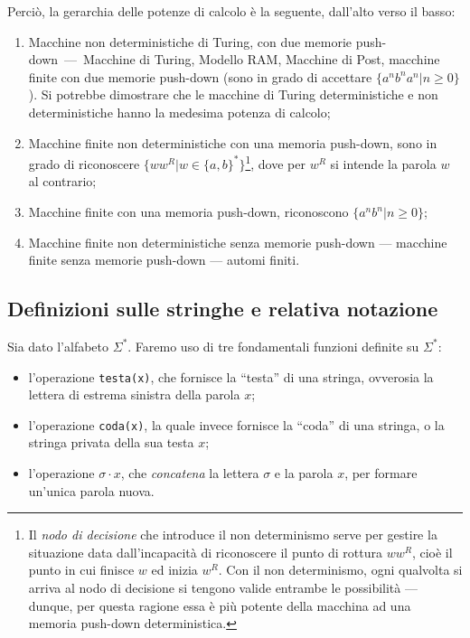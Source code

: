 \documentclass[10pt]{\classname}
\theoremstyle{definition}
\theoremstyle{definition}
\theoremstyle{definition}
\theoremstyle{definition}
\begin{document}
Perciò, la gerarchia delle potenze di calcolo è la seguente, dall'alto verso il basso:
\begin{enumerate}
    \item Macchine non deterministiche di Turing, con due memorie
        push-down~---~Macchine di Turing, Modello RAM, Macchine di Post,
        macchine finite con due memorie push-down (sono in grado di accettare
        $\{a^n b^n a^n| n \geq 0\}$). Si potrebbe dimostrare che le macchine di
        Turing deterministiche e non deterministiche hanno la medesima potenza
        di calcolo;
    \item Macchine finite non deterministiche con una memoria push-down, sono
        in grado di riconoscere $\{w w^R | w\in\{a,b\}^*\}$\footnote{Il
        \emph{nodo di decisione} che introduce il non determinismo serve per
    gestire la situazione data dall'incapacità di riconoscere il punto di
rottura $ww^R$, cioè il punto in cui finisce $w$ ed inizia $w^R$. Con il non
determinismo, ogni qualvolta si arriva al nodo di decisione si tengono valide
entrambe le possibilità --- dunque, per questa ragione essa è più potente della
macchina ad una memoria push-down deterministica.}, dove per $w^R$ si intende
la parola $w$ al contrario;
    \item Macchine finite con una memoria push-down, riconoscono $\{a^n
        b^n|n\geq 0\}$;
    \item Macchine finite non deterministiche senza memorie push-down ---
        macchine finite senza memorie push-down --- automi finiti.
\end{enumerate}


\subsection{Definizioni sulle stringhe e relativa notazione}

Sia dato l'alfabeto $\Sigma^*$. Faremo uso di tre fondamentali funzioni
definite su $\Sigma^*$:
\begin{itemize}
    \item l'operazione \texttt{testa(x)}, che fornisce la ``testa'' di una stringa,
        ovverosia la lettera di estrema sinistra della parola $x$;
    \item l'operazione \texttt{coda(x)}, la quale invece fornisce la ``coda'' di una
        stringa, o la stringa privata della sua testa $x$;
    \item l'operazione $\sigma \cdot x$, che \emph{concatena} la lettera
        $\sigma$ e la parola $x$, per formare un'unica parola nuova.
\end{itemize}
\end{document}
